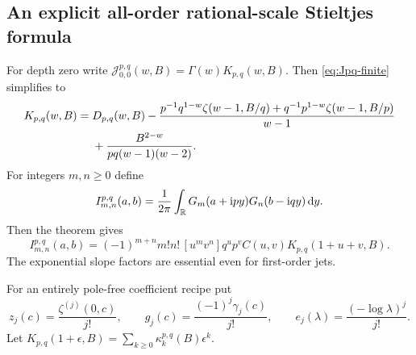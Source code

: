 \subsection{An explicit all-order rational-scale Stieltjes formula}
For depth zero write
$\mathcal J_{0,0}^{p,q}(w,B)=\Gamma(w)K_{p,q}(w,B)$.
Then \eqref{eq:Jpq-finite} simplifies to
\begin{align}
 K_{p,q}(w,B)={}&D_{p,q}(w,B)
 -\frac{p^{-1}q^{1-w}\zeta(w-1,B/q)
       +q^{-1}p^{1-w}\zeta(w-1,B/p)}{w-1}\notag\\
 &+\frac{B^{2-w}}{pq(w-1)(w-2)}.
                                  \label{eq:Kpq}
\end{align}
For integers $m,n\ge0$ define
\[
 I_{m,n}^{p,q}(a,b)=\frac1{2\pi}\int_{\mathbb R}
               G_m(a+\mathrm i py)G_n(b-\mathrm i qy)\,\mathrm d y.
\]
Then the theorem gives
\begin{equation}\label{eq:rational-Stieltjes-jets}
 \boxed{\displaystyle
 I_{m,n}^{p,q}(a,b)=(-1)^{m+n}m!n!\,[u^mv^n]
       q^up^v C(u,v)K_{p,q}(1+u+v,B).}
\end{equation}
The exponential slope factors are essential even for first-order jets.

For an entirely pole-free coefficient recipe put
\begin{equation}\label{eq:coefficient-symbols}
 z_j(c)=\frac{\zeta^{(j)}(0,c)}{j!},\qquad
 g_j(c)=\frac{(-1)^j\gamma_j(c)}{j!},\qquad
 e_j(\lambda)=\frac{(-\log\lambda)^j}{j!}.
\end{equation}
Let
$K_{p,q}(1+\epsilon,B)=\sum_{k\ge0}\kappa_k^{p,q}(B)\epsilon^k$.

